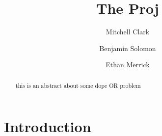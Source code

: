 \documentclass[reqno]{amsart}
\theoremstyle{plain}
\theoremstyle{definition}
\numberwithin{equation}{section}
\begin{document}
	\title[]{The Proj}
	
	\author[M.~Clark]{Mitchell Clark}
	\author[B.~Solomon]{Benjamin Solomon}
    \author[E.~Merrick]{Ethan Merrick}
	
	\subjclass[2010]{}
	
	
	\begin{abstract}
    this is an abstract about some dope OR problem
	\end{abstract}
	
	\maketitle
	
	\setcounter{tocdepth}{1}
	\tableofcontents
	\section{Introduction}
	
	
	
	\appendix
	
	
	{}
\end{document}

